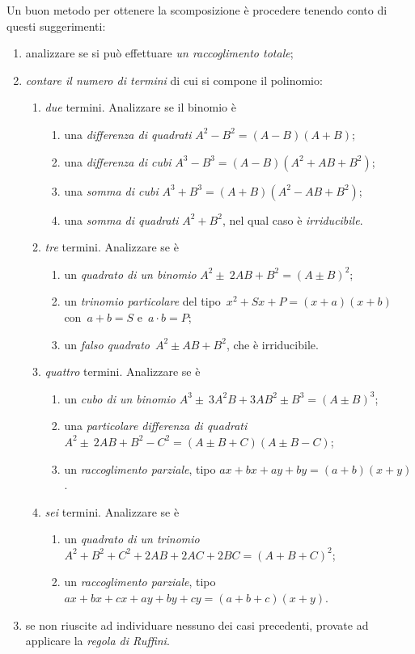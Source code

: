 Un buon metodo per ottenere la scomposizione è procedere tenendo conto
di questi suggerimenti:


\begin{enumerate}
\item analizzare se si può effettuare \emph{un raccoglimento totale};
\item \emph{contare il numero di termini} di cui si compone il polinomio:
 \begin{enumerate}
  \item \emph{due} termini. Analizzare se il binomio è
   \begin{enumerate}
	\item una \emph{differenza di quadrati} $A^{2}-B^{2}=(A-B)(A+B)$;
	\item una \emph{differenza di cubi} $A^{3}-B^{3}=(A-B)\left(A^{2}+AB+B^{2}\right)$;
	\item una \emph{somma di cubi} $A^{3}+B^{3}=(A+B)\left(A^{2}-AB+B^{2}\right)$;
	\item una \emph{somma di quadrati} $A^{2}+B^{2}$, nel qual caso è \emph{irriducibile}.
   \end{enumerate}
  \item \emph{tre} termini. Analizzare se è
   \begin{enumerate}
	\item un \emph{quadrato di un binomio} $A^{2}\pm~2AB+B^{2}=\left(A\pm B\right)^{2}$;
	\item un \emph{trinomio particolare} del tipo~$x^{2}+Sx+P=(x+a)(x+b)$ con~$a+b=S$ e~$a\cdot b=P$;
	\item un \emph{falso quadrato}~$A^{2}\pm AB+B^{2}$, che è irriducibile.
   \end{enumerate}
  \item \emph{quattro} termini. Analizzare se è
   \begin{enumerate}
	\item un \emph{cubo di un binomio} $A^{3}\pm~3A^{2}B+3AB^{2}\pm B^{3}=\left(A\pm B\right)^{3}$;
	\item una \emph{particolare differenza di quadrati}
	 \subitem $A^{2}\pm~2AB+B^{2}-C^{2}=(A\pm B+C)(A\pm B-C)$;
	\item un \emph{raccoglimento parziale}, tipo $ax+bx+ay+by=(a+b)(x+y)$.
   \end{enumerate}
  \item \emph{sei} termini. Analizzare se è
   \begin{enumerate}
	\item un \emph{quadrato di un trinomio} $A^{2}+B^{2}+C^{2}+2AB+2{AC}+2{BC}=\left(A+B+C\right)^{2}$;
	\item un \emph{raccoglimento parziale}, tipo
	 \subitem $ax+{bx}+{cx}+{ay}+{by}+{cy}=(a+b+c)(x+y)$.
   \end{enumerate}
  \end{enumerate}
 \item se non riuscite ad individuare nessuno dei casi precedenti, provate ad applicare la \emph{regola di Ruffini}.
\end{enumerate}


